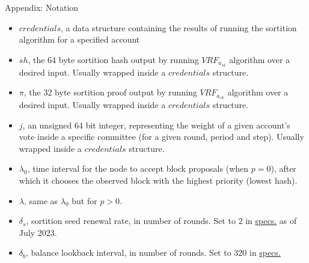 \documentclass[10pt,a4paper]{article}
\begin{document}
\begin{section}{Appendix: Notation}


\begin{itemize}
    \item $credentials$, a data structure containing the results of running the sortition algorithm 
    for a specified account
    \item $sh$, the 64 byte sortition hash output by running $VRF_{a_{sk}}$ algorithm over a desired input.
    Usually wrapped inside a $credentials$ structure.
    \item $\pi$, the 32 byte sortition proof output by running $VRF_{a_{sk}}$ algorithm over a desired input.
    Usually wrapped inside a $credentials$ structure.
    \item $j$, an unsigned 64 bit integer, representing the weight of a given account's vote inside a specific committee
    (for a given round, period and step).
    Usually wrapped inside a $credentials$ structure.
    \item $\lambda_0$, time interval for the node to accept block proposals (when $p=0$), after which it 
    chooses the observed block with the highest priority (lowest hash).
    \item $\lambda$, same as $\lambda_0$ but for $p > 0$.
    \item $\delta_s$, sortition seed renewal rate, in number of rounds. Set to $2$ in 
    \href{https://github.com/algorandfoundation/specs}{specs.} as of July 2023.
    \item $\delta_b$, balance lookback interval, in number of rounds. Set to $320$ in 
    \href{https://github.com/algorandfoundation/specs}{specs.}

\end{itemize}

\end{section}





\printindex
\end{document}
